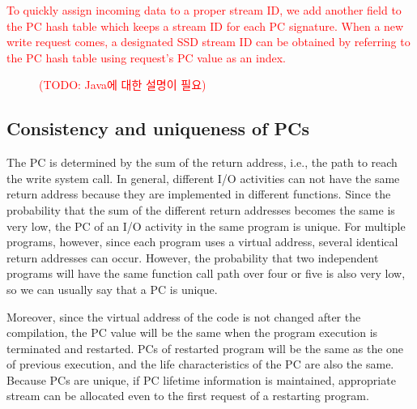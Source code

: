 \textcolor{red}{To quickly assign incoming data to a proper stream ID, we add
another field to the PC hash table which keeps a stream ID for each PC
signature.  When a new write request comes, a designated SSD stream ID can be
obtained by referring to the PC hash table using request's PC value as an
index.  }

\begin{figure}[t]
\centering
\begin{pgfpicture}
\end{pgfpicture}
\caption{\textcolor{red}{(TODO: Java에 대한 설명이 필요)}}
\label{fig:java}
\end{figure}

\subsection{Consistency and uniqueness of PCs}
The PC is determined by the sum of the return address, i.e., the path to reach the write system call. 
In general, different I/O activities can not have the same return address because they are
implemented in different functions. 
Since the probability that the sum of the different return addresses becomes the same is very low, 
the PC of an I/O activity in the same program is unique. 
For multiple programs, however, since each program uses a virtual address, 
several identical return addresses can occur. 
However, the probability that two independent programs will have the same
function call path over four or five is also very low, 
so we can usually say that a PC is unique.

Moreover, since the virtual address of the code is not changed after the compilation, 
the PC value will be the same when the program execution is terminated and restarted.
PCs of restarted program will be the same as the one of previous execution, 
and the life characteristics of the PC are also the same. 
Because PCs are unique, if PC lifetime information is maintained, appropriate stream can be allocated 
even to the first request of a restarting program.

